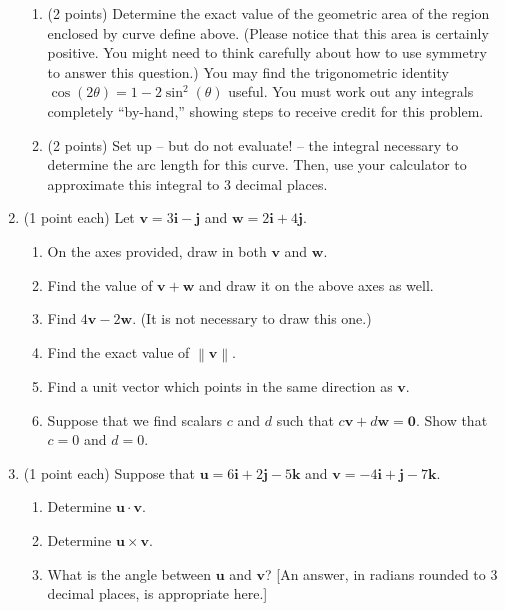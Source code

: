 \documentclass[11pt]{article}
\newcommand{\norm}[1]{\left\lVert \mathbf{#1}\right\rVert}
\begin{document}
\begin{enumerate}
\begin{enumerate}
              \item (2 points) Determine the exact value of the geometric area of the region enclosed by curve define above. (Please notice that this area is certainly positive. You might need to think carefully about how to use symmetry to answer this question.) You may find the trigonometric identity \(\cos(2\theta) = 1 - 2 \sin^{2}(\theta)\) useful. You must work out any integrals completely “by-hand,” showing steps to receive credit for this problem.
              \item (2 points) Set up -- but do not evaluate! -- the integral necessary to determine the arc length for this curve. Then, use your calculator to approximate this integral to 3 decimal places.
          \end{enumerate}
    \item (1 point each) Let \(\mathbf{v} = 3\mathbf{i} - \mathbf{j}\) and \(\mathbf{w} = 2\mathbf{i} + 4\mathbf{j}\).
          \begin{enumerate}
              \item On the axes provided, draw in both \(\mathbf{v}\) and \(\mathbf{w}\).
              \item Find the value of \(\mathbf{v} + \mathbf{w}\) and draw it on the above axes as well.
              \item Find \(4\mathbf{v} - 2\mathbf{w}\). (It is not necessary to draw this one.)
              \item Find the exact value of \(\norm{v}\).
              \item Find a unit vector which points in the same direction as \(\mathbf{v}\).
              \item Suppose that we find scalars \(c\) and \(d\) such that \(c\mathbf{v} + d\mathbf{w} = \mathbf{0}\). Show that \(c = 0\) and \(d = 0\).
          \end{enumerate}
    \item (1 point each) Suppose that \(\mathbf{u} = 6\mathbf{i} + 2\mathbf{j} - 5\mathbf{k}\) and \(\mathbf{v} = -4\mathbf{i} + \mathbf{j} - 7\mathbf{k}\).
          \begin{enumerate}
              \item Determine \(\mathbf{u} \cdot \mathbf{v}\).
              \item Determine \(\mathbf{u} \times \mathbf{v}\).
              \item What is the angle between \(\mathbf{u}\) and \(\mathbf{v}\)? [An answer, in radians rounded to 3 decimal places, is appropriate here.]

\end{enumerate}
\end{enumerate}
\end{document}

